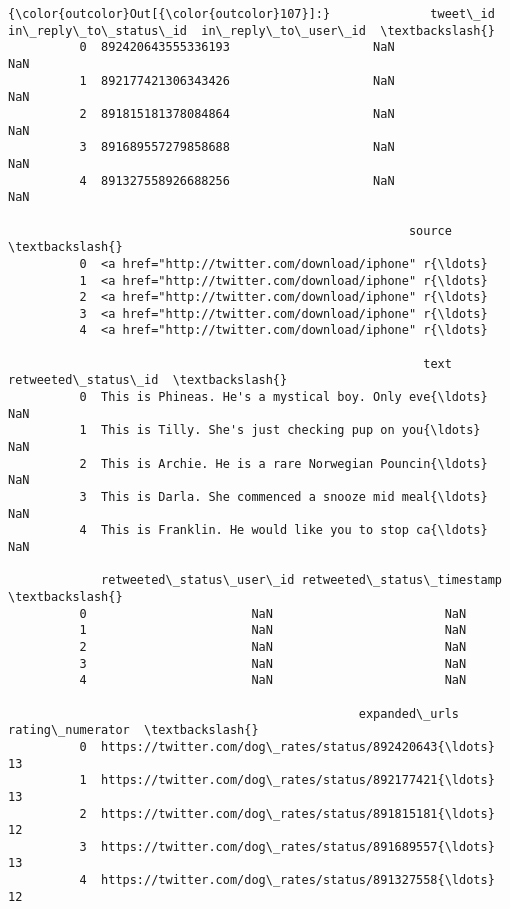 \documentclass[11pt]{article}
\begin{document}
\begin{Verbatim}[commandchars=\\\{\}]
{\color{outcolor}Out[{\color{outcolor}107}]:}              tweet\_id  in\_reply\_to\_status\_id  in\_reply\_to\_user\_id  \textbackslash{}
          0  892420643555336193                    NaN                  NaN   
          1  892177421306343426                    NaN                  NaN   
          2  891815181378084864                    NaN                  NaN   
          3  891689557279858688                    NaN                  NaN   
          4  891327558926688256                    NaN                  NaN   
          
                                                        source  \textbackslash{}
          0  <a href="http://twitter.com/download/iphone" r{\ldots}   
          1  <a href="http://twitter.com/download/iphone" r{\ldots}   
          2  <a href="http://twitter.com/download/iphone" r{\ldots}   
          3  <a href="http://twitter.com/download/iphone" r{\ldots}   
          4  <a href="http://twitter.com/download/iphone" r{\ldots}   
          
                                                          text  retweeted\_status\_id  \textbackslash{}
          0  This is Phineas. He's a mystical boy. Only eve{\ldots}                  NaN   
          1  This is Tilly. She's just checking pup on you{\ldots}                  NaN   
          2  This is Archie. He is a rare Norwegian Pouncin{\ldots}                  NaN   
          3  This is Darla. She commenced a snooze mid meal{\ldots}                  NaN   
          4  This is Franklin. He would like you to stop ca{\ldots}                  NaN   
          
             retweeted\_status\_user\_id retweeted\_status\_timestamp  \textbackslash{}
          0                       NaN                        NaN   
          1                       NaN                        NaN   
          2                       NaN                        NaN   
          3                       NaN                        NaN   
          4                       NaN                        NaN   
          
                                                 expanded\_urls  rating\_numerator  \textbackslash{}
          0  https://twitter.com/dog\_rates/status/892420643{\ldots}                13   
          1  https://twitter.com/dog\_rates/status/892177421{\ldots}                13   
          2  https://twitter.com/dog\_rates/status/891815181{\ldots}                12   
          3  https://twitter.com/dog\_rates/status/891689557{\ldots}                13   
          4  https://twitter.com/dog\_rates/status/891327558{\ldots}                12   
          

\end{Verbatim}
\end{document}
